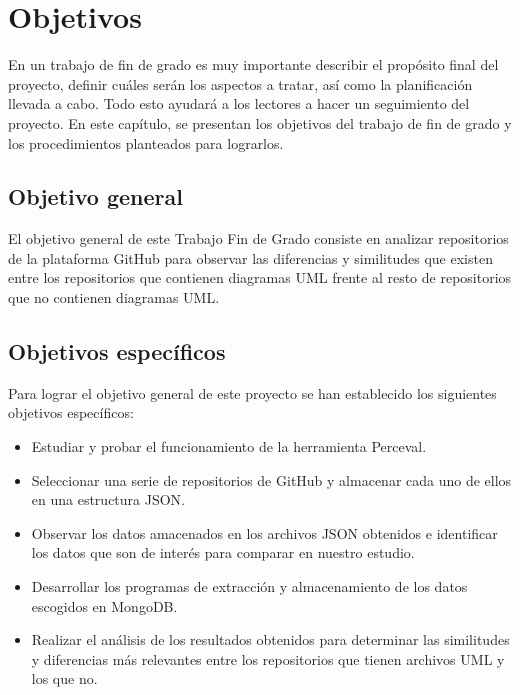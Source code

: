 \documentclass[a4paper, 12pt]{book}
\begin{document}
\cleardoublepage %
\chapter{Objetivos} %
\label{chap:objetivos} %

En un trabajo de fin de grado es muy importante describir el propósito final del proyecto, definir cuáles serán los aspectos a tratar, así como la planificación llevada a cabo.
Todo esto ayudará a los lectores a hacer un seguimiento del proyecto. 
En este capítulo, se presentan los objetivos del trabajo de fin de grado y los procedimientos planteados para lograrlos.


\section{Objetivo general} %
\label{sec:objetivo-general} %

El objetivo general de este Trabajo Fin de Grado consiste en analizar repositorios de la plataforma GitHub para observar las diferencias y similitudes que existen entre los repositorios que contienen diagramas UML frente al resto de repositorios que no contienen diagramas UML.

\section{Objetivos específicos}
\label{sec:objetivos-especificos}

Para lograr el objetivo general de este proyecto se han establecido los siguientes objetivos específicos:

\begin{itemize}
  \item Estudiar y probar el funcionamiento de la herramienta Perceval.
  \item Seleccionar una serie de repositorios de GitHub y almacenar cada uno de ellos en una estructura JSON.
  \item Observar los datos amacenados en los archivos JSON obtenidos e identificar los datos que son de interés para comparar en nuestro estudio.
  \item Desarrollar los programas de extracción y almacenamiento de los datos escogidos en MongoDB.  
  \item Realizar el análisis de los resultados obtenidos para determinar las similitudes y diferencias más relevantes entre los repositorios que tienen archivos UML y los que no.
\end{itemize}
\end{document}
